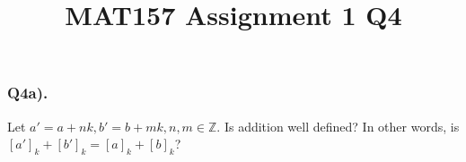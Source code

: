 \documentclass{article}
\title{MAT157 Assignment 1 Q4}
\begin{document}
\subsubsection*{Q4a).}
Let $a' = a + nk, b' = b + mk, n,m \in \mathbb{Z}$. Is addition well defined? In other words, is $[a']_{k} + [b']_{k} = [a]_{k} + [b]_{k}$?
\end{document}
